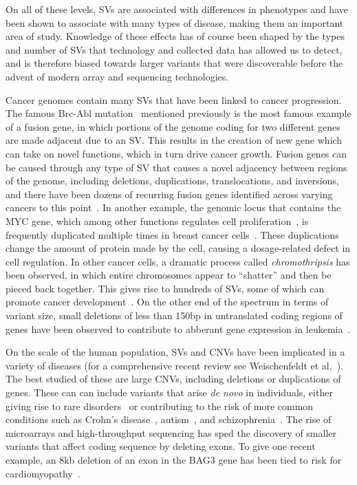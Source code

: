 On all of these levels, SVs are associated with differences in phenotypes and have been shown to associate with many types of disease, making them an important area of study. Knowledge of these effects has of course been shaped by the types and number of SVs that technology and collected data has allowed us to detect, and is therefore biased towards larger variants that were discoverable before the advent of modern array and sequencing technologies. 

Cancer genomes contain many SVs that have been linked to cancer progression. The famous Brc-Abl mutation~\cite{Kurzrock:2003bz} mentioned previously is the most famous example of a fusion gene, in which portions of the genome coding for two different genes are made adjacent due to an SV. This results in the creation of new gene which can take on novel functions, which in turn drive cancer growth. Fusion genes can be caused through any type of SV that causes a novel adjacency between regions of the genome, including deletions, duplications, translocations, and inversions, and there have been dozens of recurring fusion genes identified across varying cancers to this point~\cite{Annala:2013ks}. In another example, the genomic locus that contains the MYC gene, which among other functions regulates cell proliferation~\cite{Eilers:2008jk}, is frequently duplicated multiple times in breast cancer cells~\cite{Escot:1986tn}. These duplications change the amount of protein made by the cell, causing a dosage-related defect in cell regulation. In other cancer cells, a dramatic process called \emph{chromothripsis} has been observed, in which entire chromosomes appear to ``shatter'' and then be pieced back together. This gives rise to hundreds of SVs, some of which can promote cancer development~\cite{Stephens:2011bm}. On the other end of the spectrum in terms of variant size, small deletions of less than 150bp in untranslated coding regions of genes have been observed to contribute to abberant gene expression in leukemia~\cite{Hosokawa:1998wi}.

On the scale of the human population, SVs and CNVs have been implicated in a variety of diseases (for a comprehensive recent review see Weischenfeldt et al.~\cite{Weischenfeldt:2013fm}). The best studied of these are large CNVs, including deletions or duplications of genes. These can can include variants that arise \emph{de novo} in individuals, either giving rise to rare disorders~\cite{Lupski:1998ip} or contributing to the risk of more common conditions such as Crohn's disease~\cite{McCarroll:2008jt}, autism~\cite{Sebat:2007bs}, and schizophrenia~\cite{Walsh:2008kp}. The rise of microarrays and high-throughput sequencing has sped the discovery of smaller variants that affect coding sequence by deleting exons. To give one recent example, an 8kb deletion of an exon in the BAG3 gene has been tied to risk for cardiomyopathy~\cite{Norton:2011ev}. 

